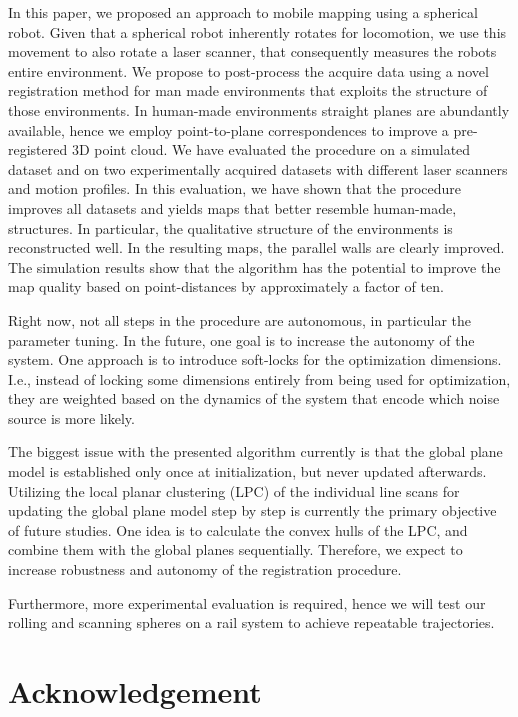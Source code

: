 \documentclass[5p]{elsarticle}
\begin{document}
In this paper, we proposed an approach to mobile mapping using a spherical robot. 
Given that a spherical robot inherently rotates for locomotion, we use this movement to also rotate a laser scanner, that consequently measures the robots entire environment.
We propose to post-process the acquire data using a novel registration method for man made environments that exploits the structure of those environments. 
In human-made environments straight planes are abundantly available, hence we employ point-to-plane correspondences to improve a pre-registered 3D point cloud. 
We have evaluated the procedure on a simulated dataset and on two experimentally acquired datasets with different laser scanners and motion profiles. 
In this evaluation, we have shown that the procedure improves all datasets and yields maps that better resemble human-made, structures. 
In particular, the qualitative structure of the environments is reconstructed well. 
In the resulting maps, the parallel walls are clearly improved.
The simulation results show that the algorithm has the potential to improve the map quality based on point-distances by approximately a factor of ten.

%
Right now, not all steps in the procedure are autonomous, in particular the parameter tuning. 
In the future, one goal is to increase the autonomy of the system.
One approach is to introduce soft-locks for the optimization dimensions.
I.e., instead of locking some dimensions entirely from being used for optimization, they are weighted based on the dynamics of the system that encode which noise source is more likely.  

%
The biggest issue with the presented algorithm currently is that the global plane model is established only once at initialization, but never updated afterwards.
Utilizing the local planar clustering (LPC) of the individual line scans for updating the global plane model step by step is currently the primary objective of future studies.
One idea is to calculate the convex hulls of the LPC, and combine them with the global planes sequentially.
Therefore, we expect to increase robustness and autonomy of the registration procedure.

%
Furthermore, more experimental evaluation is required, hence we will test our rolling and scanning spheres on a rail system to achieve repeatable trajectories. 

\section*{Acknowledgement}
\end{document}
